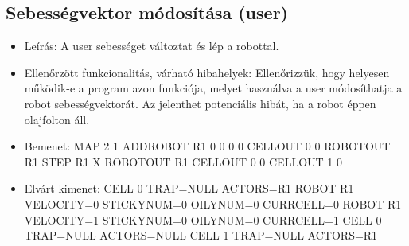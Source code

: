 \subsection{Sebességvektor módosítása (user)}
\begin{itemize}
	\item Leírás: \newline
 A user sebességet változtat és lép a robottal.

	\item Ellenőrzött funkcionalitás, várható hibahelyek: \newline
Ellenőrizzük, hogy helyesen működik-e a program azon funkciója, melyet használva a user módosíthatja a robot sebességvektorát. Az jelenthet potenciális hibát, ha a robot éppen olajfolton áll.

	\item Bemenet: \newline
MAP 2 1  \newline
ADDROBOT R1 0 0 0 0 \newline
CELLOUT 0 0 \newline
ROBOTOUT R1 \newline 
STEP R1 X \newline
ROBOTOUT R1 \newline
CELLOUT 0 0 \newline
CELLOUT 1 0

	
	\item Elvárt kimenet: \newline
CELL 0 TRAP=NULL ACTORS=R1 \newline
ROBOT R1 VELOCITY=0 STICKYNUM=0 OILYNUM=0 CURRCELL=0 \newline
ROBOT R1 VELOCITY=1 STICKYNUM=0 OILYNUM=0 CURRCELL=1 \newline
CELL 0 TRAP=NULL ACTORS=NULL \newline
CELL 1 TRAP=NULL ACTORS=R1 \newline

	
\end{itemize}



